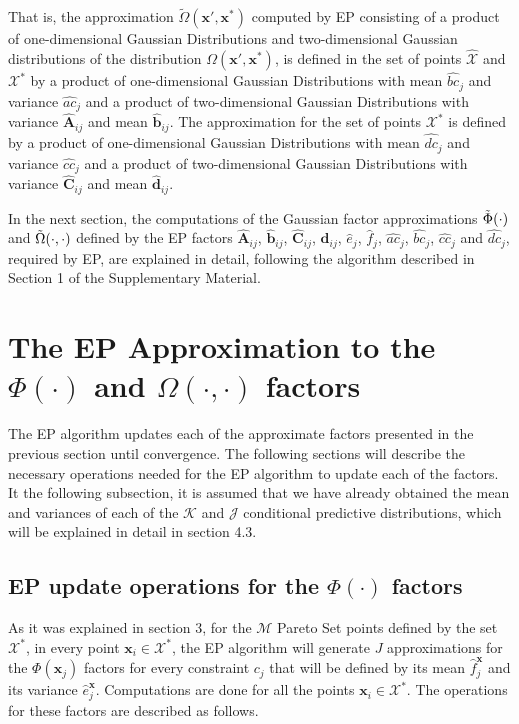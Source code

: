 That is, the approximation $\tilde{\Omega}(\boldsymbol{x}',\boldsymbol{x}^*)$ computed by EP consisting of a product of one-dimensional Gaussian Distributions and two-dimensional Gaussian distributions of the distribution $\Omega(\boldsymbol{x}',\boldsymbol{x}^*)$, is defined in the set of points $\hat{\mathcal{X}}$ and $\mathcal{X}^*$ by a product of one-dimensional Gaussian Distributions with mean $\hat{bc}_j$ and variance $\hat{ac}_j$ and a product of two-dimensional Gaussian Distributions with variance $\hat{\boldsymbol{A}}_{ij}$ and mean $\hat{\boldsymbol{b}}_{ij}$. The approximation for the set of points $\mathcal{X}^*$ is defined by a product of one-dimensional Gaussian Distributions with mean $\hat{dc}_j$ and variance $\hat{cc}_j$ and a product of two-dimensional Gaussian Distributions with variance $\hat{\boldsymbol{C}}_{ij}$ and mean $\hat{\boldsymbol{d}}_{ij}$.

In the next section, the computations of the Gaussian factor approximations $\Tilde{\Phi}(\cdot)$ and $\Tilde{\Omega}(\cdot,\cdot)$ defined by the EP factors $\hat{\boldsymbol{A}}_{ij}$, $\hat{\boldsymbol{b}}_{ij}$, $\hat{\boldsymbol{C}}_{ij}$, $\hat{\boldsymbol{d}}_{ij}$, $\hat{e}_{j}$, $\hat{f}_{j}$, $\hat{ac}_j$, $\hat{bc}_j$, $\hat{cc}_j$ and $\hat{dc}_j$, required by EP, are explained in detail, following the algorithm described in Section 1 of the Supplementary Material.

\section{The EP Approximation to the $\Phi(\cdot)$ and $\Omega(\cdot,\cdot)$ factors}

The EP algorithm updates each of the approximate factors presented in the previous section until convergence. The following sections will describe the necessary operations needed for the EP algorithm to update each of the factors. It the following subsection, it is assumed that we have already obtained the mean and variances of each of the $\mathcal{K}$ and $\mathcal{J}$ conditional predictive distributions, which will be explained in detail in section 4.3.

\subsection{EP update operations for the $\Phi(\cdot)$ factors}

As it was explained in section 3, for the $\mathcal{M}$ Pareto Set points defined by the set $\mathcal{X}^*$, in every point $\boldsymbol{x}_i \in \mathcal{X}^*$, the EP algorithm will generate $J$ approximations for the $\Phi(\boldsymbol{x}_j)$ factors for every constraint $c_j$ that will be defined by its mean $\hat{f}_{j}^{\boldsymbol{x}}$ and its variance $\hat{e}_{j}^{\boldsymbol{x}}$. Computations are done for all the points $\boldsymbol{x}_i \in \mathcal{X}^*$. The operations for these factors are described as follows.


